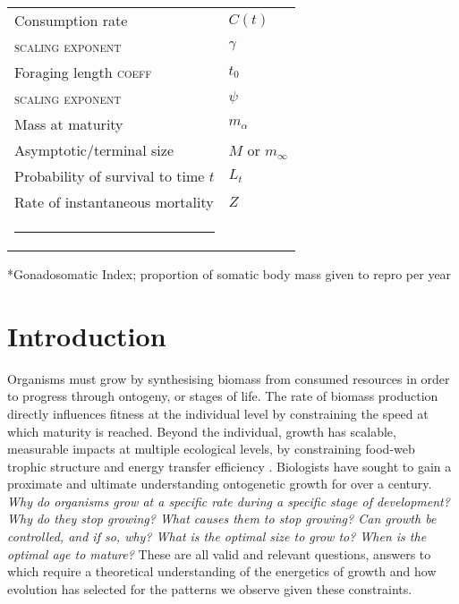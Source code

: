 \documentclass[a4paper]{article} %
\makeatletter
\newcommand{\thickhline}{%
    \noalign {\ifnum 0=`}\fi \hrule height 1pt
    \futurelet \reserved@a \@xhline
}
\makeatother
\begin{document}
\begin{table}[h]
\begin{tabularx}{0.7\linewidth}{ll}
    Consumption rate                                                    & $C(t)$                \\ 
    \textsc{scaling exponent}                                           & $\gamma$              \\ \hline
    Foraging length \textsc{coeff}                                      & $t_0$                 \\
    \textsc{scaling exponent}                                           & $\psi$                \\ \hline
    Mass at maturity                                                    & $m_{\alpha}$          \\ \hline
    Asymptotic/terminal size                                            & $M$ or $m_{\infty}$   \\ \hline
    Probability of survival to time $t$                                 & $L_t$                 \\ \hline
    Rate of instantaneous mortality                                     & $Z$                   \\ \thickhline
    \end{tabularx}
\end{table}

*Gonadosomatic Index; proportion of somatic body mass given to repro per year

\newpage
\section{Introduction}\thispagestyle{plain}
    Organisms must grow by synthesising biomass from consumed resources in order to progress through ontogeny, or stages of life. The rate of biomass production directly influences fitness at the individual level by constraining the speed at which maturity is reached. Beyond the individual, growth has scalable, measurable impacts at multiple ecological levels, by constraining food-web trophic structure and energy transfer efficiency \autocite{Barneche2018}. Biologists have sought to gain a proximate and ultimate understanding ontogenetic growth for over a century. \textit{Why do organisms grow at a specific rate during a specific stage of development? Why do they stop growing? What causes them to stop growing? Can growth be controlled, and if so, why? What is the optimal size to grow to? When is the optimal age to mature?} These are all valid and relevant questions, answers to which require a theoretical understanding of the energetics of growth and how evolution has selected for the patterns we observe given these constraints. 
    
\end{document}
